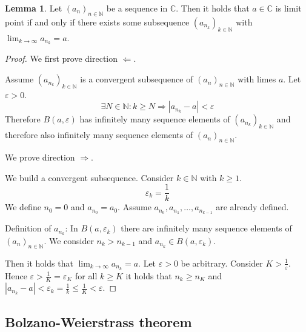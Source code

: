 \documentclass[a4paper,landscape,twocolumn]{article}
\theoremstyle{definition}
\newtheorem{lemma}{Lemma}
\newcommand\abs[1]{\left|#1\right|}
\newcommand\seq[1]{{\left(#1\right)}_{n \in \mathbb N}}
\begin{document}
\begin{lemma}
  Let $\seq{a_n}$ be a sequence in $\mathbb C$. Then it holds that
  $a \in \mathbb C$ is limit point if and only if there exists some subsequence
  $\left(a_{n_k}\right)_{k \in \mathbb N}$ with $\lim_{k \to \infty} a_{n_k} = a$.
\end{lemma}
\begin{proof}
  We first prove direction $\Leftarrow$.

  Assume $\left(a_{n_k}\right)_{k \in \mathbb N}$ is a convergent subsequence
  of $\seq{a_n}$ with limes $a$.
  Let $\varepsilon > 0$.
  \[ \exists N \in \mathbb N: k \geq N \Rightarrow \abs{a_{n_k} - a} < \varepsilon \]
  Therefore $B(a, \varepsilon)$ has infinitely many sequence elements of $\left(a_{n_k}\right)_{k\in\mathbb N}$
  and therefore also infinitely many sequence elements of $\seq{a_n}$.

  We prove direction $\Rightarrow$.

  We build a convergent subsequence. Consider $k \in \mathbb N$ with $k \geq 1$.
  \[ \varepsilon_k = \frac1k \]
  We define $n_0 = 0$ and $a_{n_0} = a_0$.
  Assume $a_{n_0}, a_{n_1}, \dots, a_{n_{k-1}}$ are already defined.

  Definition of $a_{n_k}$: In $B(a, \varepsilon_k)$ there are infinitely many sequence elements of $\seq{a_n}$.
  We consider $n_k > n_{k-1}$ and $a_{n_k} \in B(a, \varepsilon_k)$.

  Then it holds that $\lim_{k\to\infty} a_{n_k} = a$.
  Let $\varepsilon > 0$ be arbitrary. Consider $K > \frac1\varepsilon$.
  Hence $\varepsilon > \frac1K = \varepsilon_K$ for all $k \geq K$ it holds that
  $n_k \geq n_K$ and $\abs{a_{n_k} - a} < \varepsilon_k = \frac1k \leq \frac1K < \varepsilon$.
\end{proof}

\subsection{Bolzano-Weierstrass theorem}
\end{document}

